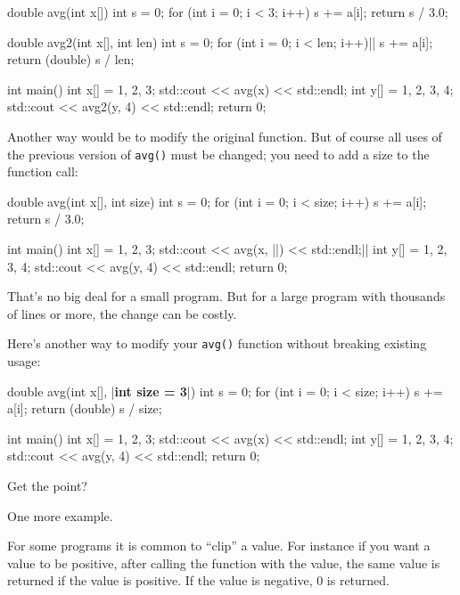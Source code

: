 \begin{consolethree}[escapeinside=||]
double avg(int x[])
{
    int s = 0;
    for (int i = 0; i < 3; i++)
    {
        s += a[i];
    }
    return s / 3.0;
}

double avg2(int x[], int len)
{
    int s = 0;
    for (int i = 0; i < len; i++)||
    {
        s += a[i];
    }
    return (double) s / len;
}

int main()
{
    int x[] = {1, 2, 3};
    std::cout << avg(x) << std::endl;
    int y[] = {1, 2, 3, 4};
    std::cout << avg2(y, 4) << std::endl;
    return 0;
}
\end{consolethree}

Another way would be to modify the original function. But of course all uses of the previous version of \texttt{avg()} must be changed; you need to add a size to the function call:

\begin{consolethree}[escapeinside=||]
double avg(int x[], int size)
{
    int s = 0;
    for (int i = 0; i < size; i++)
    {
        s += a[i];
    }
    return s / 3.0;
}

int main()
{
    int x[] = {1, 2, 3};
    std::cout << avg(x, ||) << std::endl;||
    int y[] = {1, 2, 3, 4};
    std::cout << avg(y, 4) << std::endl;
    return 0;
}
\end{consolethree}

That's no big deal for a small program. But for a large program with thousands of lines or more, the change can be costly.

Here's another way to modify your \texttt{avg()} function without breaking existing usage:

\begin{consolethree}[escapeinside=||]
double avg(int x[], |\textbf{int size = 3}|)
{
    int s = 0;
    for (int i = 0; i < size; i++)
    {
        s += a[i];
    }
    return (double) s / size;
}

int main()
{
    int x[] = {1, 2, 3};
    std::cout << avg(x) << std::endl;
    int y[] = {1, 2, 3, 4};
    std::cout << avg(y, 4) << std::endl;
    return 0;
}
\end{consolethree}

Get the point?

One more example.

For some programs it is common to ``clip'' a value. For instance if you want a value to be positive, after calling the function with the value, the same value is returned if the value is positive. If the value is negative, 0 is returned.

